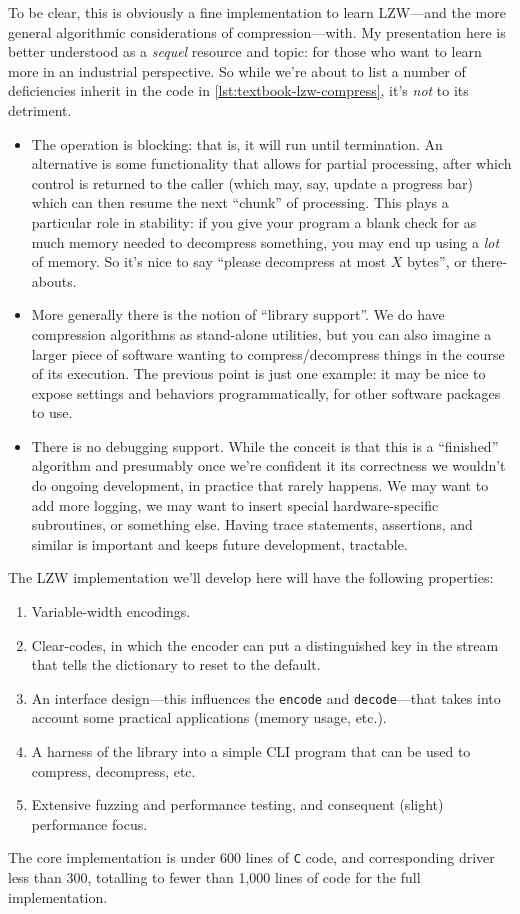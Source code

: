 \documentclass{scrartcl}
\begin{document}
To be clear, this is obviously a fine implementation to learn LZW---and the more general algorithmic considerations of compression---with.
My presentation here is better understood as a \emph{sequel} resource and topic: for those who want to learn more in an industrial perspective.
So while we're about to list a number of deficiencies inherit in the code in \cref{lst:textbook-lzw-compress}, it's \emph{not} to its detriment.
\begin{itemize}
    \item The operation is blocking: that is, it will run until termination.
          An alternative is some functionality that allows for partial processing, after which control is returned to the caller (which may, say, update a progress bar) which can then resume the next ``chunk'' of processing.
          This plays a particular role in stability: if you give your program a blank check for as much memory needed to decompress something, you may end up using a \emph{lot} of memory.
          So it's nice to say ``please decompress at most $X$ bytes'', or there-abouts.
    \item More generally there is the notion of ``library support''.
          We do have compression algorithms as stand-alone utilities, but you can also imagine a larger piece of software wanting to compress/decompress things in the course of its execution.
          The previous point is just one example: it may be nice to expose settings and behaviors programmatically, for other software packages to use.
    \item There is no debugging support.
          While the conceit is that this is a ``finished'' algorithm and presumably once we're confident it its correctness we wouldn't do ongoing development, in practice that rarely happens.
          We may want to add more logging, we may want to insert special hardware-specific subroutines, or something else.
          Having trace statements, assertions, and similar is important and keeps future development, tractable.
\end{itemize}

The LZW implementation we'll develop here will have the following properties:
\begin{enumerate}
    \item Variable-width encodings.
    \item Clear-codes, in which the encoder can put a distinguished key in the stream that tells the dictionary to reset to the default.
    \item An interface design---this influences the \texttt{encode} and \texttt{decode}---that takes into account some practical applications (memory usage, etc.).
    \item A harness of the library into a simple CLI program that can be used to compress, decompress, etc.
    \item Extensive fuzzing and performance testing, and consequent (slight) performance focus.
\end{enumerate}
The core implementation is under 600 lines of \texttt{C} code, and corresponding driver less than 300, totalling to fewer than 1,000 lines of code for the full implementation.
\end{document}
